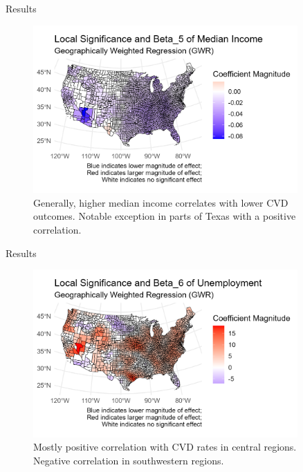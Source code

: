 \documentclass[
  ignorenonframetext,
]{beamer}
\begin{document}
\begin{frame}{Results}
\label{results-7}
\begin{figure}[H]

{\centering \includegraphics[width=0.9\textwidth,height=\textheight]{PresentationPhotos/medIncomePlot.png}

}

\caption{Generally, higher median income correlates with lower CVD
outcomes. Notable exception in parts of Texas with a positive
correlation.}

\end{figure}%
\end{frame}

\begin{frame}{Results}
\label{results-8}
\begin{figure}[H]

{\centering \includegraphics[width=0.9\textwidth,height=\textheight]{PresentationPhotos/unemployPlot.png}

}

\caption{Mostly positive correlation with CVD rates in central regions.
Negative correlation in southwestern regions.}

\end{figure}%
\end{frame}
\end{document}
